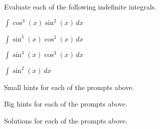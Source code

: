 \begin{activity} \label{A:5.2.1}  Evaluate each of the following indefinite integrals.  

\bmtwo
\ba
	\item $\int \cos^3(x)\sin^2(x) \, dx$
	\item $\int \sin^5(x)\cos^2(x) \, dx$
	\item $\int \sin^3(x)\cos^3(x) \, dx $
	\item $\int \sin^2(x) \, dx $
\ea
\emtwo
\end{activity}
\begin{smallhint}
\ba
	\item Small hints for each of the prompts above.
\ea
\end{smallhint}
\begin{bighint}
\ba
	\item Big hints for each of the prompts above.
\ea
\end{bighint}
\begin{activitySolution}
\ba
	\item Solutions for each of the prompts above.
\ea
\end{activitySolution}
\aftera